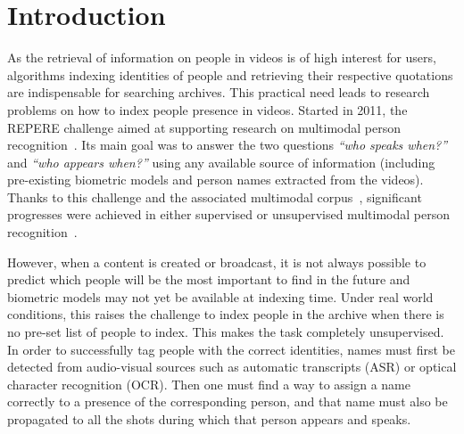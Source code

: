 \section{Introduction}

As the retrieval of information on people in videos is of high interest for users, algorithms indexing identities of people and retrieving their respective quotations are indispensable for searching archives. This practical need leads to research problems on how to index people presence in videos.
%
%
%
Started in 2011, the REPERE challenge aimed at supporting research on multimodal person recognition~\cite{BERNARD--SLAM--2013, GIRAUDEL--LREC--2012}. Its main goal was to answer the two questions \emph{``who speaks when?''} and \emph{``who appears when?''} using any available source of information (including pre-existing biometric models and person names extracted from the videos).
%
Thanks to this challenge and the associated multimodal corpus~\cite{GIRAUDEL--LREC--2012}, significant progresses were achieved in either supervised or unsupervised multimodal person recognition~\cite{BECHET--INTERSPEECH--2014, BREDIN--IJMIR--2014, GAY--CBMI--2014, poignant2012fusion, ROUVIER--CBMI--2014}.

However, when a content is created or broadcast, it is not always possible to predict which people will be the most important to find in the future and biometric models may not yet be available at indexing time.
%
Under real world conditions, this raises the challenge to index people in the archive when there is no pre-set list of people to index.
%
This makes the task completely unsupervised.
%
In order to successfully tag people with the correct identities, names must first be detected from audio-visual sources such as automatic transcripts (ASR) or optical character recognition (OCR).
%
Then one must find a way to assign a name correctly to a presence of the corresponding person, and that name must also be propagated to all the shots during which that person appears and speaks. 
%


